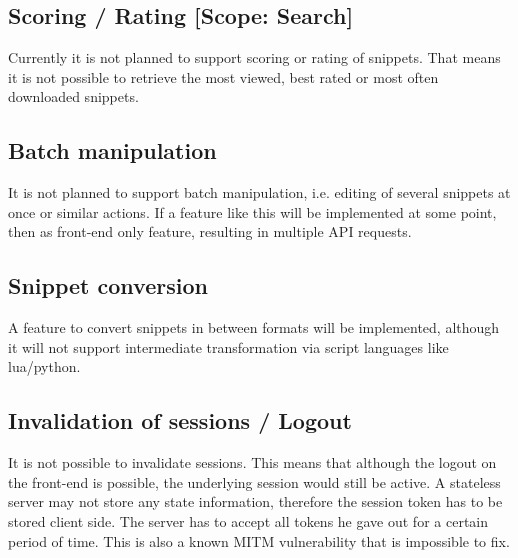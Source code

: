 \subsection*{Scoring / Rating \mbox{[}Scope\+: Search\mbox{]}}

Currently it is not planned to support scoring or rating of snippets. That means it is not possible to retrieve the most viewed, best rated or most often downloaded snippets.

\subsection*{Batch manipulation}

It is not planned to support batch manipulation, i.\+e. editing of several snippets at once or similar actions. If a feature like this will be implemented at some point, then as front-\/end only feature, resulting in multiple A\+P\+I requests.

\subsection*{Snippet conversion}

A feature to convert snippets in between formats will be implemented, although it will not support intermediate transformation via script languages like lua/python.

\subsection*{Invalidation of sessions / Logout}

It is not possible to invalidate sessions. This means that although the logout on the front-\/end is possible, the underlying session would still be active. A stateless server may not store any state information, therefore the session token has to be stored client side. The server has to accept all tokens he gave out for a certain period of time. This is also a known M\+I\+T\+M vulnerability that is impossible to fix. 